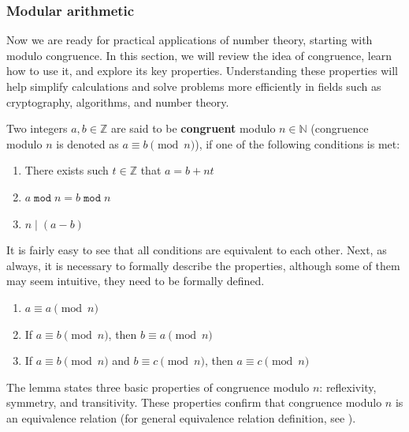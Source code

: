 \documentclass[../lecture-notes.tex]{subfiles}
\begin{document}
\subsubsection{Modular arithmetic}

Now we are ready for practical applications of number theory, starting with modulo congruence.
In this section, we will review the idea of congruence, learn how to use it, and explore
its key properties. Understanding these properties will help simplify calculations and solve 
problems more efficiently in fields such as cryptography, algorithms, and number theory.

\begin{definition}
    Two integers $a, b \in \mathbb{Z}$ are said to be \textbf{congruent} modulo $n \in \mathbb{N}$ (congruence modulo $n$ is denoted as $a \equiv b \pmod{n}$), if one of the following conditions is met:
    \begin{enumerate}
        \item There exists such $t \in \mathbb{Z}$ that $a = b + nt$
        \item $a \; \texttt{mod} \; n = b \; \texttt{mod} \; n$
        \item $n \mid (a - b)$
    \end{enumerate}
\end{definition}

It is fairly easy to see that all conditions are equivalent to each other. Next, as always, it is necessary to formally describe the properties, although some of them may seem intuitive, they need to be formally defined.

\begin{lemma} 
    \hfill
    \begin{enumerate}
        \item $a \equiv a \pmod{n}$
        \item If $a \equiv b \pmod{n}$, then $b \equiv a \pmod{n}$
        \item If $a \equiv b \pmod{n}$ and $b \equiv c \pmod{n}$, then $a \equiv c \pmod{n}$
    \end{enumerate}
\end{lemma}

The lemma states three basic properties of congruence modulo $n$: reflexivity, symmetry, and transitivity. 
These properties confirm that congruence modulo $n$ is an equivalence relation (for general equivalence relation definition, see ).
\end{document}
